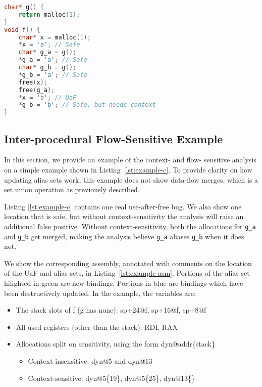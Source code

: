\begin{lstlisting}[language=C, float=t, caption={Example (C)}, label=lst:example-c]
char* g() {
	return malloc(1);
}
void f() {
	char* x = malloc(1);
	*x = 'a'; // Safe
	char* g_a = g();
	*g_a = 'a'; // Safe
	char* g_b = g();
	*g_b = 'a'; // Safe
	free(x);
	free(g_a);
	*x = 'b'; // UaF
	*g_b = 'b'; // Safe, but needs context
}
\end{lstlisting}

\subsection{Inter-procedural Flow-Sensitive Example}
In this section, we provide an example of the context- and flow-
sensitive analysis on a simple example shown in
Listing~\ref{lst:example-c}. To provide clarity on how updating alias
sets work, this example does not show data-flow merges, which is a set
union operation as previously described.

Listing \ref{lst:example-c} contains one real use-after-free bug.
We also show one location that is safe, but without context-sensitivity the analysis will raise an additional false positive.
Without context-sensitivity, both the allocations for \texttt{g\_a} and \texttt{g\_b} get merged, making the analysis believe \texttt{g\_a} aliases \texttt{g\_b} when it does not.




We show the corresponding assembly, annotated with comments on the location of the UaF and alias sets, in Listing~\ref{lst:example-asm}.
Portions of the alias set hilighted in green are new bindings.
Portions in blue are bindings which have been destructively updated.
In the example, the variables are:
\begin{itemize}
	\item The stack slots of f (g has none): sp+24@f, sp+16@f, sp+8@f
	\item All used registers (other than the stack): RDI, RAX
	\item Allocations split on sensitivity, using the form dyn@addr\{stack\}
          \begin{itemize}
          \item Context-insensitive: dyn@5 and dyn@13
          \item Context-sensitive: dyn@5\{19\}, dyn@5\{25\}, dyn@13\{\}
          \end{itemize}
\end{itemize}


